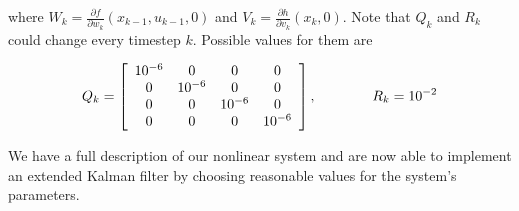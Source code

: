 \documentclass{article}
\begin{document}
where \(W_k = \frac{\partial f}{\partial w_k}(x_{k-1},u_{k-1},0)\) and \(V_k = \frac{\partial h}{\partial v_k}(x_k,0)\). Note that \(Q_k\) and \(R_k\) could change every timestep \(k\). Possible values for them are

\[Q_k = \left[
\begin{array}{c c c c}
10^{-6} & 0 & 0 & 0 \\
0 & 10^{-6} & 0 & 0 \\
0 & 0 & 10^{-6} & 0 \\
0 & 0 & 0 & 10^{-6} \\
\end{array}
\right], \qquad\qquad R_k = 10^{-2}
\]

We have a full description of our nonlinear system and are now able to implement an extended Kalman filter by choosing reasonable values for the system's parameters.
\end{document}
